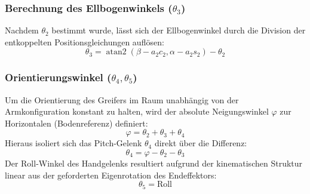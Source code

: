 \subsubsection*{Berechnung des Ellbogenwinkels ($\theta_3$)}
Nachdem $\theta_2$ bestimmt wurde, lässt sich der Ellbogenwinkel durch die Division der entkoppelten Positionsgleichungen auflösen:
\begin{equation}
	\theta_3 = \operatorname{atan2}(\beta - a_2 c_2, \alpha - a_2 s_2) - \theta_2
\end{equation}

\subsubsection*{Orientierungswinkel ($\theta_4, \theta_5$)}
Um die Orientierung des Greifers im Raum unabhängig von der Armkonfiguration konstant zu halten, wird der absolute Neigungswinkel $\varphi$ zur Horizontalen (Bodenreferenz) definiert:
\begin{equation}
	\varphi = \theta_2 + \theta_3 + \theta_4
\end{equation}
Hieraus isoliert sich das Pitch-Gelenk $\theta_4$ direkt über die Differenz:
\begin{equation}
	\theta_4 = \varphi - \theta_2 - \theta_3
\end{equation}
Der Roll-Winkel des Handgelenks resultiert aufgrund der kinematischen Struktur linear aus der geforderten Eigenrotation des Endeffektors:
\begin{equation}
	\theta_5 = \text{Roll}
\end{equation}
\clearpage

